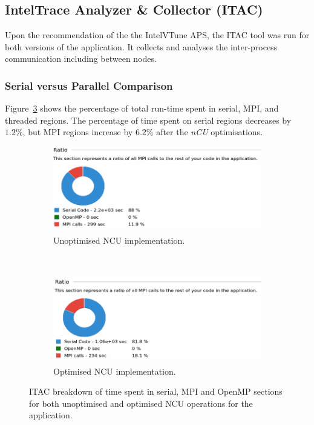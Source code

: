 \subsection{Intel\textregistered Trace Analyzer \& Collector (ITAC)}
\label{sec:Intel_ITAC}
Upon the recommendation of the the Intel\textregistered VTune APS, the ITAC tool was run for both versions of the application. It collects and analyses the inter-process communication including between nodes. 

\subsubsection{Serial versus Parallel Comparison}
Figure~\ref{fig:itac_pie} shows the percentage of total run-time spent in serial, MPI, and threaded regions. The percentage of time spent on serial regions decreases by $1.2\%$, but MPI regions increase by $6.2\%$ after the \textit{nCU} optimisations. 

\begin{figure}[H]%
    \centering
    \begin{subfigure}{1.\linewidth}
        \centering
        \includegraphics[width=1.\linewidth]{Images/MPI_Serial_Pie/orig_pie.png}
		\caption{Unoptimised NCU implementation.}
        \label{fig:itac_pie_unopt_ncu}
    \end{subfigure}\\
    \begin{subfigure}{1.\linewidth}
        \centering
        \includegraphics[width=1.\linewidth]{Images/MPI_Serial_Pie/ncu_pie.png}
		\caption{Optimised NCU implementation.}
        \label{fig:itac_pie_opt_ncu}
    \end{subfigure}
    \caption{ITAC breakdown of time spent in serial, MPI and OpenMP sections     for both unoptimised and optimised NCU operations for the application.}
        \label{fig:itac_pie}
\end{figure}

